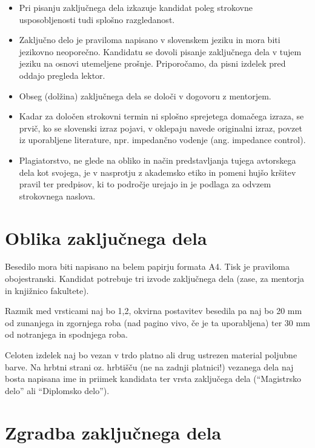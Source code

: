 \documentclass[a4paper,twoside,openright,12pt,slovene]{book}
\begin{document}
\begin{itemize}

\item Pri pisanju zaključnega dela izkazuje kandidat poleg strokovne usposobljenosti tudi splošno razgledanost.

\item Zaključno delo je praviloma napisano v slovenskem jeziku in mora biti jezikovno neoporečno. Kandidatu se dovoli pisanje zaključnega dela v tujem jeziku na osnovi utemeljene prošnje. Priporočamo, da pisni izdelek pred oddajo pregleda lektor.

\item Obseg (dolžina) zaključnega dela se določi v dogovoru z mentorjem.

\item Kadar za določen strokovni termin ni splošno sprejetega domačega izraza, se prvič, ko se slovenski izraz pojavi, v oklepaju navede originalni izraz, povzet iz uporabljene literature, npr. impedančno vodenje (ang. impedance control).

\item Plagiatorstvo, ne glede na obliko in način predstavljanja tujega avtorskega dela kot svojega, je v nasprotju z akademsko etiko in pomeni hujšo kršitev pravil ter predpisov, ki to področje urejajo in je podlaga za odvzem strokovnega naslova.

\end{itemize}

\section{Oblika zaključnega dela} \label{oblika_dela}

Besedilo mora biti napisano na belem papirju formata A4. Tisk je praviloma obojestranski. Kandidat potrebuje tri izvode zaključnega dela (zase, za mentorja in knjižnico fakultete).

Razmik med vrsticami naj bo 1,2, okvirna postavitev besedila pa naj bo 20 mm od zunanjega in zgornjega roba (nad pagino vivo, če je ta uporabljena) ter 30 mm od notranjega in spodnjega roba.

Celoten izdelek naj bo vezan v trdo platno ali drug ustrezen material poljubne barve. Na hrbtni strani oz. hrbtišču (ne na zadnji platnici!) vezanega dela naj bosta napisana ime in priimek kandidata ter vrsta zaključega dela (``Magistrsko delo'' ali ``Diplomsko delo'').

\section{Zgradba zaključnega dela} \label{zgradba_dela}
\end{document}
